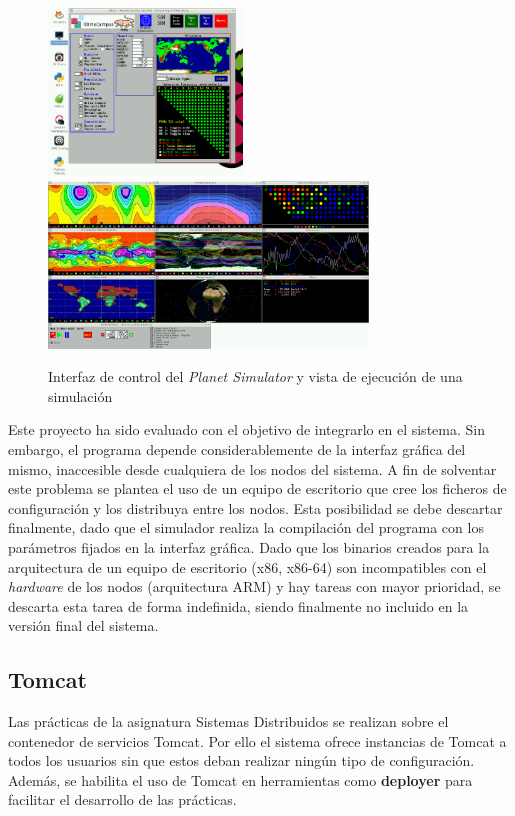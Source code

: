 \begin{figure}[H]
\includegraphics[height=12em]{Chapters/Chapter3/Figures/plasim-main}
\includegraphics[height=12em]{Chapters/Chapter3/Figures/plasim-results}
\label{fig:plasim}
\caption[Interfaz de la aplicación \textit{Planet Simulator}]{Interfaz de control del \textit{Planet Simulator} y vista de ejecución de una simulación}
\end{figure}

Este proyecto ha sido evaluado con el objetivo de integrarlo en el sistema. Sin embargo, el programa depende considerablemente de la interfaz gráfica del mismo, inaccesible desde cualquiera de los nodos del sistema. A fin de solventar este problema se plantea el uso de un equipo de escritorio que cree los ficheros de configuración y los distribuya entre los nodos. Esta posibilidad se debe descartar finalmente, dado que el simulador realiza la compilación del programa con los parámetros fijados en la interfaz gráfica. Dado que los binarios creados para la arquitectura de un equipo de escritorio (x86, x86-64) son incompatibles con el \textit{hardware} de los nodos (arquitectura ARM) y hay tareas con mayor prioridad, se descarta esta tarea de forma indefinida, siendo finalmente no incluido en la versión final del sistema.

\subsection{Tomcat}

Las prácticas de la asignatura Sistemas Distribuidos se realizan sobre el contenedor de servicios Tomcat. Por ello el sistema ofrece instancias de Tomcat a todos los usuarios sin que estos deban realizar ningún tipo de configuración. Además, se habilita el uso de Tomcat en herramientas como \textbf{deployer} para facilitar el desarrollo de las prácticas.

